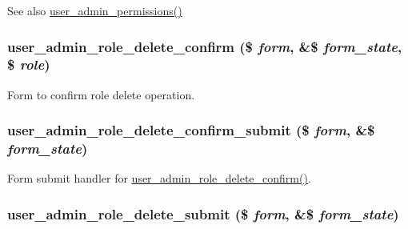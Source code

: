 \begin{DoxySeeAlso}{See also}
\hyperlink{group__forms_gabcf8ce0bd54bdce14e7abeea7ed2bad9}{user\_\-admin\_\-permissions()} 
\end{DoxySeeAlso}
\hypertarget{user_8admin_8inc_a3e68f9349198e39b9854f876a7a295fb}{
\subsubsection[{user\_\-admin\_\-role\_\-delete\_\-confirm}]{\setlength{\rightskip}{0pt plus 5cm}user\_\-admin\_\-role\_\-delete\_\-confirm (\$ {\em form}, \/  \&\$ {\em form\_\-state}, \/  \$ {\em role})}}
\label{user_8admin_8inc_a3e68f9349198e39b9854f876a7a295fb}
Form to confirm role delete operation. \hypertarget{user_8admin_8inc_ae983d48bc867c0154f4c4af502cefd71}{
\subsubsection[{user\_\-admin\_\-role\_\-delete\_\-confirm\_\-submit}]{\setlength{\rightskip}{0pt plus 5cm}user\_\-admin\_\-role\_\-delete\_\-confirm\_\-submit (\$ {\em form}, \/  \&\$ {\em form\_\-state})}}
\label{user_8admin_8inc_ae983d48bc867c0154f4c4af502cefd71}
Form submit handler for \hyperlink{user_8admin_8inc_a3e68f9349198e39b9854f876a7a295fb}{user\_\-admin\_\-role\_\-delete\_\-confirm()}. \hypertarget{user_8admin_8inc_a43838b5335621b4c5d7914b3d4ee34b9}{
\subsubsection[{user\_\-admin\_\-role\_\-delete\_\-submit}]{\setlength{\rightskip}{0pt plus 5cm}user\_\-admin\_\-role\_\-delete\_\-submit (\$ {\em form}, \/  \&\$ {\em form\_\-state})}}
\label{user_8admin_8inc_a43838b5335621b4c5d7914b3d4ee34b9}
